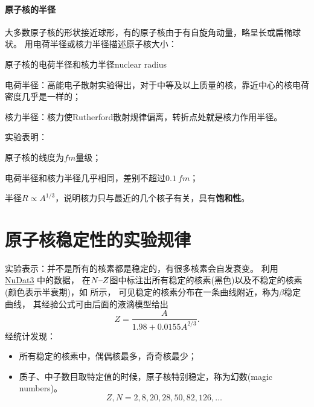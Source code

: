 \paragraph{原子核的半径}

大多数原子核的形状接近球形，有的原子核由于有自旋角动量，略呈长或扁椭球状。
用电荷半径或核力半径描述原子核大小：
\begin{definition}
	{原子核的电荷半径和核力半径}{nuclear radius}
	\begin{compactitem}
		\item 电荷半径：高能电子散射实验得出，对于中等及以上质量的核，靠近中心的核电荷密度几乎是一样的；
		\item 核力半径：核力使Rutherford散射规律偏离，转折点处就是核力作用半径。
	\end{compactitem}
\end{definition}
实验表明：
\begin{compactenum}
	\item 原子核的线度为$\unit{fm}$量级；
	\item 电荷半径和核力半径几乎相同，差别不超过$\qty{0.1}{fm}$；
	\item 半径$R \propto A^{1/3}$，说明核力只与最近的几个核子有关，具有\textbf{饱和性}。
\end{compactenum}

\section{原子核稳定性的实验规律}

实验表示：并不是所有的核素都是稳定的，有很多核素会自发衰变。
利用 \href{https://www.nndc.bnl.gov/nudat3/}{NuDat3} 中的数据，
在$N\vs Z$图中标注出所有稳定的核素(黑色)以及不稳定的核素(颜色表示半衰期)，如 所示，
可见稳定的核素分布在一条曲线附近，称为$\beta$稳定曲线，
其经验公式可由后面的液滴模型给出
\begin{equation}
	Z = \frac A{1.98 + 0.0155A^{2/3}}.
\end{equation}
经统计发现：
\begin{itemize}
	\item 所有稳定的核素中，偶偶核最多，奇奇核最少；
	\item 质子、中子数目取特定值的时候，原子核特别稳定，称为幻数(magic numbers)。
	\begin{equation}
		Z,N = 2,8,20,28,50,82,126,\ldots
	\end{equation}
\end{itemize}

